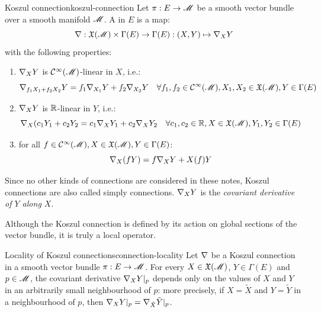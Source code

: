 \begin{definition}{Koszul connection}{koszul-connection}
  Let $ \pi : E \rightarrow \mathscr{M} $ be a smooth vector bundle over a smooth manifold $ \mathscr{M} $. A  in $ E $ is a map:
  \begin{equation}
    \nabla : \mathfrak{X}(\mathscr{M}) \times \Gamma(E) \rightarrow \Gamma(E) : (X , Y) \mapsto \nabla_X Y
  \end{equation}
  with the following properties:
  \begin{enumerate}
    \item \label{item:kc-1} $ \nabla_X Y $ is $ \mathcal{C}^{\infty}(\mathscr{M}) $-linear in $ X $, i.e.:
      \begin{equation*}
        \nabla_{f_1 X_1 + f_2 X_2} Y = f_1 \nabla_{X_1} Y + f_2 \nabla_{X_2} Y
        \quad
        \forall f_1 , f_2 \in \mathcal{C}^{\infty}(\mathscr{M}) , X_1 , X_2 \in \mathfrak{X}(\mathscr{M}) , Y \in \Gamma(E)
      \end{equation*}
    \item \label{item:kc-2} $ \nabla_X Y $ is $ \mathbb{R} $-linear in $ Y $, i.e.:
      \begin{equation*}
        \nabla_X (c_1 Y_1 + c_2 Y_2 = c_1 \nabla_X Y_1 + c_2 \nabla_X Y_2
        \quad
        \forall c_1 , c_2 \in \mathbb{R} , X \in \mathfrak{X}(\mathscr{M}) , Y_1 , Y_2 \in \Gamma(E)
      \end{equation*}
    \item \label{item:kc-3} for all $ f \in \mathcal{C}^{\infty}(\mathscr{M}) , X \in \mathfrak{X}(\mathscr{M}) , Y \in \Gamma(E) $:
      \begin{equation}
        \nabla_X (f Y) = f \nabla_X Y + X(f) Y
      \end{equation}
  \end{enumerate}
\end{definition}

Since no other kinds of connections are considered in these notes, Koszul connections are also called simply connections. $ \nabla_X Y $ is the \emph{covariant derivative of $ Y $ along $ X $}.

Although the Koszul connection is defined by its action on global sections of the vector bundle, it is truly a local operator.

\begin{lemma}{Locality of Koszul connections}{connection-locality}
  Let $ \nabla $ be a Koszul connection in a smooth vector bundle $ \pi : E \rightarrow \mathscr{M} $. For every $ X \in \mathfrak{X}(\mathscr{M}) $, $ Y \in \Gamma(E) $ and $ p \in \mathscr{M} $, the covariant derivative $ \nabla_X Y \vert_p $ depends only on the values of $ X $ and $ Y $ in an arbitrarily small neighbourhood of $ p $: more precisely, if $ X = \tilde{X} $ and $ Y = \tilde{Y} $ in a neighbourhood of $ p $, then $ \nabla_X Y \vert_p = \nabla_{\tilde{X}} \tilde{Y} \vert_p $.
\end{lemma}

